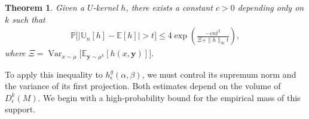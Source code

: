 \documentclass[11pt,reqno]{amsproc}
\numberwithin{equation}{section}
\newcommand{\E}{\mathbb{E}}
\newcommand{\U}{\mathbb{U}}
\newcommand{\PP}{\mathbb{P}}
\newcommand{\by}{\mathbf{y}}
\newcommand{\Var}{\operatorname{Var}}
\newtheorem{theorem}[counter]{Theorem}
\theoremstyle{definition}
\theoremstyle{plain}
\begin{document}
    \begin{theorem}{\cite{hoeffding_probability_1963,arcones_bernstein-type_1995}} \label{thm:bernstein}
        Given a $U$-kernel $h$, there exists a constant $c> 0$ depending only on $k$ such that 
        \begin{align}
            \PP\big[ |\U_n[h] - \E[h]| > t\big] \leq 4 \exp \left(\frac{-cn t^2}{\Xi + \|h\|_\infty t}\right),
        \end{align}
        where $\Xi = \Var_{x \sim \mu}\Big[\E_{\by \sim \mu^k}[h(x,\by)]\Big]$.
    \end{theorem}

    To apply this inequality to $h^g_\epsilon(\alpha, \beta)$, we must control its supremum norm and the variance of its first projection. Both estimates depend on the volume of $D^k_\epsilon(M)$. We begin with a high-probability bound for the empirical mass of this support.
\end{document}
